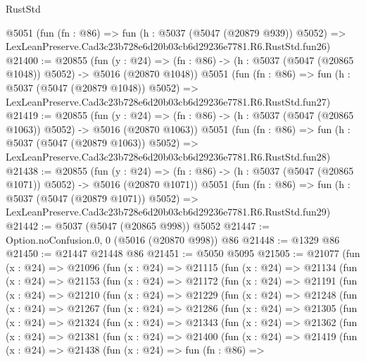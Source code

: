 \begin{lexlean}{RustStd}
\begin{coremodule}
    @5051
    (fun (fn : @86) =>
    fun (h : @5037 (@5047 (@20879 @939)) @5052) =>
    LexLeanPreserve.Cad3c23b728e6d20b03cb6d29236e7781.R6.RustStd.fun26)
@21400 := @20855
    (fun (y : @24) =>
    (fn : @86) -> (h : @5037 (@5047 (@20865 @1048)) @5052) -> @5016 (@20870 @1048))
    @5051
    (fun (fn : @86) =>
    fun (h : @5037 (@5047 (@20879 @1048)) @5052) =>
    LexLeanPreserve.Cad3c23b728e6d20b03cb6d29236e7781.R6.RustStd.fun27)
@21419 := @20855
    (fun (y : @24) =>
    (fn : @86) -> (h : @5037 (@5047 (@20865 @1063)) @5052) -> @5016 (@20870 @1063))
    @5051
    (fun (fn : @86) =>
    fun (h : @5037 (@5047 (@20879 @1063)) @5052) =>
    LexLeanPreserve.Cad3c23b728e6d20b03cb6d29236e7781.R6.RustStd.fun28)
@21438 := @20855
    (fun (y : @24) =>
    (fn : @86) -> (h : @5037 (@5047 (@20865 @1071)) @5052) -> @5016 (@20870 @1071))
    @5051
    (fun (fn : @86) =>
    fun (h : @5037 (@5047 (@20879 @1071)) @5052) =>
    LexLeanPreserve.Cad3c23b728e6d20b03cb6d29236e7781.R6.RustStd.fun29)
@21442 := @5037 (@5047 (@20865 @998)) @5052
@21447 := Option.noConfusion.{0, 0} (@5016 (@20870 @998)) @86
@21448 := @1329 @86
@21450 := @21447 @21448 @86
@21451 := @5050 @5095
@21505 := @21077
    (fun (x : @24) =>
    @21096
      (fun (x : @24) =>
      @21115
        (fun (x : @24) =>
        @21134
          (fun (x : @24) =>
          @21153
            (fun (x : @24) =>
            @21172
              (fun (x : @24) =>
              @21191
                (fun (x : @24) =>
                @21210
                  (fun (x : @24) =>
                  @21229
                    (fun (x : @24) =>
                    @21248
                      (fun (x : @24) =>
                      @21267
                        (fun (x : @24) =>
                        @21286
                          (fun (x : @24) =>
                          @21305
                            (fun (x : @24) =>
                            @21324
                              (fun (x : @24) =>
                              @21343
                                (fun (x : @24) =>
                                @21362
                                  (fun (x : @24) =>
                                  @21381
                                    (fun (x : @24) =>
                                    @21400
                                      (fun (x : @24) =>
                                      @21419
                                        (fun (x : @24) =>
                                        @21438
                                          (fun (x : @24) =>
                                          fun (fn : @86) =>

\end{coremodule}
\end{lexlean}
